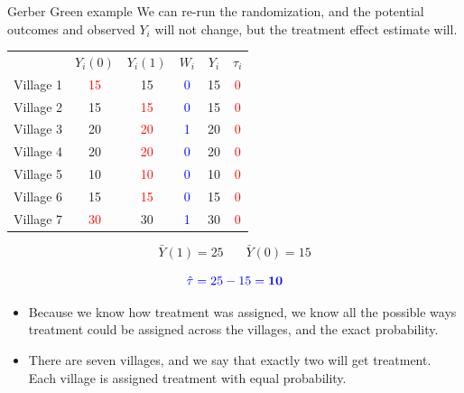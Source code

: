 \documentclass[xcolor={dvipsnames},handout]{beamer}
\begin{document}
\begin{frame}{Gerber Green example}
We can re-run the randomization, and the potential outcomes and observed $Y_i$ will not change, but the treatment effect estimate will.

\begin{table}[]
\begin{tabular}{lccccc}
& $Y_i(0)$ & $Y_i(1)$ & $W_i$ & $Y_i$ & $\tau_i$ \\
Village 1 & \textcolor{red}{15} & 15 & \textcolor{blue}{0} & 15 & \textcolor{red}{0} \\
Village 2 & 15 & \textcolor{red}{15} & \textcolor{blue}{0} & 15 &\textcolor{red}{0} \\
Village 3 & 20 & \textcolor{red}{20} & \textcolor{blue}{1} & 20 &\textcolor{red}{0} \\
Village 4 & 20 & \textcolor{red}{20} & \textcolor{blue}{0} & 20 &\textcolor{red}{0} \\
Village 5 & 10 & \textcolor{red}{10} & \textcolor{blue}{0} & 10 &\textcolor{red}{0} \\
Village 6 & 15 & \textcolor{red}{15} & \textcolor{blue}{0} & 15 &\textcolor{red}{0} \\
Village 7 & \textcolor{red}{30} & 30 & \textcolor{blue}{1} & 30 &\textcolor{red}{0}
\end{tabular}
\end{table}

$$
\bar{Y}(1) = 25 \ \ \ \ \ \ \ \ \bar{Y}(0) = 15
$$

$$
\color{blue}{\hat{\tau} = 25-15 = \bm{10}}
$$

\end{frame}



\begin{frame}

\begin{itemize}
\item Because we know how treatment was assigned, we know all the possible ways treatment could be assigned across the villages, and the exact probability.
\item There are seven villages, and we say that exactly two will get treatment. Each village is assigned treatment with equal probability.

\end{itemize}

\end{frame}
\end{document}
